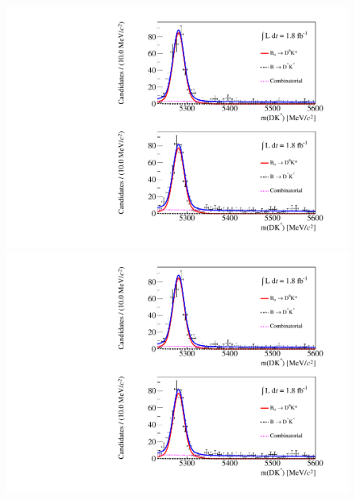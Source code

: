 \begin{figure}
\includegraphics[trim = 0 0.5\imageheight{} 0 0,clip,width=0.5\linewidth]{figures/results/canvas_d2kpipipi_DD_run2.pdf}
\includegraphics[trim = 0 0 0 0.5\imageheight{},clip,width=0.5\linewidth]{figures/results/canvas_d2kpipipi_DD_run2.pdf}
\hfill
{}

\end{figure}
